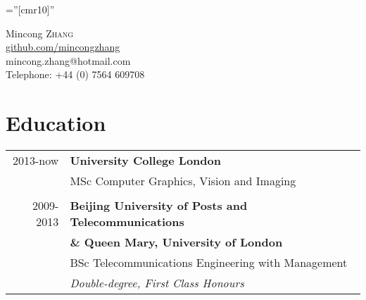 \documentclass[a4paper,10pt]{article}
\begin{document}

\pagestyle{empty} %

\font\fb=''[cmr10]'' %

\par{\centering
		{\Huge Mincong \textsc{Zhang}
	}\bigskip \\ \href{https://github.com/mincongzhang}{github.com/mincongzhang} \\mincong.zhang@hotmail.com\\ Telephone: +44 (0) 7564 609708 \par}

\section{Education}
\begin{tabular}{rl}

2013-now
&\textbf{University College London}\\
& MSc Computer Graphics, Vision and Imaging\\
\\
2009-2013 
&\textbf{Beijing University of Posts and Telecommunications}\\
&\textbf{\& Queen Mary, University of London}\\
& BSc Telecommunications Engineering with Management\\
&\emph{Double-degree, First Class Honours}\\
\end{tabular}

\end{document}
